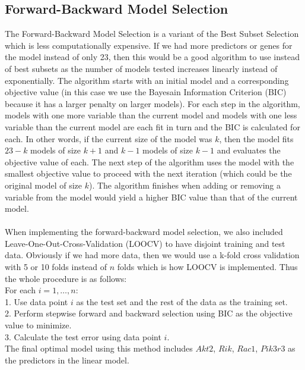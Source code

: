 \documentclass{article}
\begin{document}
\subsection{Forward-Backward Model Selection}
The Forward-Backward Model Selection is a variant of the Best Subset Selection which is less computationally expensive.  If we had more predictors or genes for the model instead of only 23, then this would be a good algorithm to use instead of best subsets as the number of models tested increases linearly instead of exponentially.  The algorithm starts with an initial model and a corresponding objective value (in this case we use the Bayesain Information Criterion (BIC) because it has a larger penalty on larger models).  For each step in the algorithm, models with one more variable than the current model and models with one less variable than the current model are each fit in turn and the BIC is calculated for each.  In other words, if the current size of the model was $k$, then the model fits $23-k$ models of size $k+1$ and $k-1$ models of size $k-1$ and evaluates the objective value of each.  The next step of the algorithm uses the model with the smallest objective value to proceed with the next iteration (which could be the original model of size $k$).  The algorithm finishes when adding or removing a variable from the model would yield a higher BIC value than that of the current model.\\
\null\\
When implementing the forward-backward model selection, we also included Leave-One-Out-Cross-Validation (LOOCV) to have disjoint training and test data.  Obviously if we had more data, then we would use a k-fold cross validation with 5 or 10 folds instead of $n$ folds which is how LOOCV is implemented.  Thus the whole procedure is as follows:\\
\newpage
For each $i=1,\dots, n$:\\
1. Use data point $i$ as the test set and the rest of the data as the training set.\\
2. Perform stepwise forward and backward selection using BIC as the objective value to minimize.\\
3. Calculate the test error using data point $i$. \\
The final optimal model using this method includes $Akt2$, $Rik$, $Rac1$, $Pik3r3$ as the predictors in the linear model.
\end{document}
